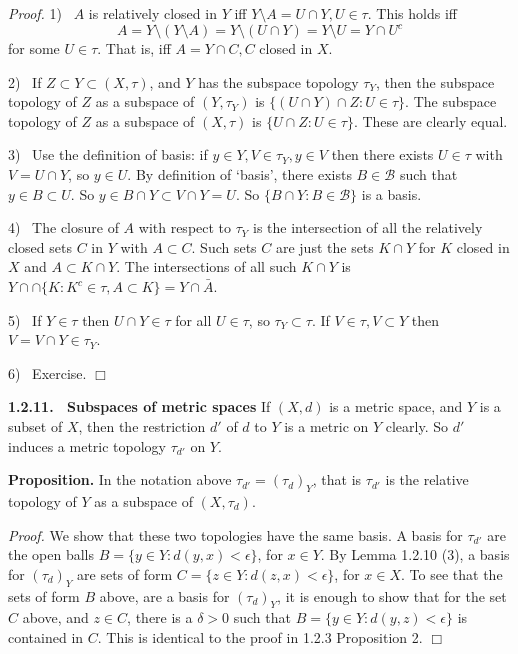 \documentclass[12pt]{article}
\newcommand{\B}[0] { \mathcal{B} }
\begin{document}
\begin{flushleft}
 \emph{Proof.  } 1) \ $A$ is  relatively closed in $Y$ iff
$Y \setminus A = U \cap Y, U \in \tau$.  This holds iff
$$A = Y \setminus (Y \setminus A) = Y \setminus (U \cap Y)
= Y \setminus U = Y \cap U^c$$
for some $U \in \tau$.  That is, iff
$A = Y \cap C, C$ closed in $X$.

2) \ If $Z \subset Y \subset (X, \tau)$, and $Y$ has the subspace topology
$\tau_Y$, then the
subspace topology of $Z$ as a subspace of $(Y,\tau_Y)$ is
$\{ (U \cap Y) \cap Z : U \in \tau \}$.
The subspace topology of $Z$ as a subspace of $(X, \tau)$
is $\{ U \cap  Z : U \in \tau \}$.  These are clearly equal.

3) \ Use the definition of basis: if $y \in Y, V \in \tau_Y, y \in V$ then
there exists $U \in \tau$ with $V = U \cap Y$, so $y \in U$.
By definition of `basis', there exists $B \in \B$ such that
$y \in B \subset U$.  So $y \in B \cap Y \subset V  \cap Y = U$.
So $\{ B  \cap Y: B \in \B \}$ is a basis.

4) \ The closure of $A$ with respect to $\tau_Y$ is the intersection
of all the relatively closed sets $C$ in $Y$ with $A \subset C$.
Such  sets $C$ are just the sets $K \cap Y$ for $K$ closed in $X$ and
$A \subset K \cap Y$.  The intersections of all such $K \cap Y$ is
$Y \cap \cap \{ K : K^c \in \tau , A \subset K \} = Y \cap \bar{A}$.

5) \ If $Y \in \tau$ then $U \cap Y \in \tau$ for all $U \in \tau$,
so $\tau_Y \subset \tau$.  If $V \in \tau, V \subset Y$ then
$V = V \cap Y \in \tau_Y$.

6) \ Exercise.  $\Box$
\end{flushleft}

\begin{flushleft}
 { \bf 1.2.11. \ Subspaces of metric spaces}  If $(X,d)$ is a metric space,
and $Y$ is a subset of $X$, then the restriction $d'$ of $d$ to $Y$
is a metric on $Y$ clearly.  So $d'$ induces a metric topology $\tau_{d'}$ on $Y$.
\end{flushleft}

\begin{flushleft}
{\bf Proposition.}  In the notation above $\tau_{d'} = (\tau_d)_Y$, that is
$\tau_{d'}$ is the relative topology of $Y$ as a subspace of $(X, \tau_d)$.
\end{flushleft}
 \emph{Proof.  }   We show that these two topologies have the same basis.
A basis for $\tau_{d'}$ are the open balls
$B = \{ y \in Y : d(y,x) < \epsilon \}$, for $x \in Y$.
By Lemma 1.2.10 (3), a basis for $(\tau_d)_Y$ are sets of form
$C = \{ z \in Y : d(z,x)  < \epsilon \}$, for $x \in X$.
To see that the sets of form $B$ above, are a basis for $(\tau_d)_Y$,
it is enough to show that for the set $C$ above, and $z \in C$,
there is a $\delta > 0$ such that
$B =  \{ y \in Y : d(y,z) < \epsilon \}$  is contained in $C$.
This is identical to the proof in
1.2.3 Proposition 2.    $\Box$
\end{document}
